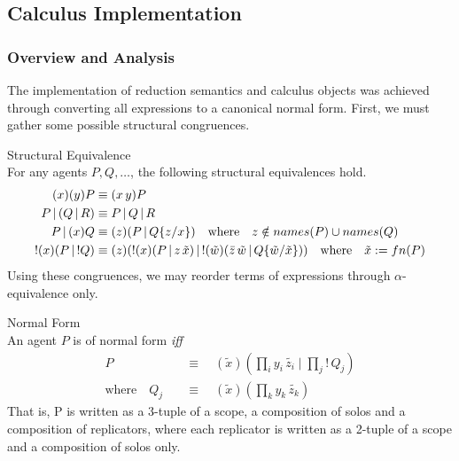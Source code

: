 \subsection{Calculus Implementation}\label{ssec:calculus-implementation}
    
    \subsubsection{Overview and Analysis}\label{sssec:calculus-analysis}
        The implementation of reduction semantics and calculus objects was achieved through converting all expressions to a canonical normal form.
        First, we must gather some possible structural congruences.

        \begin{lemma}{Structural Equivalence\\}
            For any agents $P, Q, \ldots$, the following structural equivalences hold.
            \begin{align*}
                (x)(y) P                & \equiv (x \, y) P \\
                P \, | \, (Q \, | \, R) & \equiv P \, | \, Q \, | \, R \\
                P \, | \, (x) Q         & \equiv (z)(P \, | \, Q\{z / x\}) \quad \text{where} \quad z \notin names(P) \cup names(Q) \\
                !(x)(P \, | \, !Q)      & \equiv (z)(!(x)(P \, | \, z \, \tilde{x}) \, | \, !(\tilde{w})(\bar{z} \, \tilde{w} \, | \, Q\{\tilde{w}/\tilde{x}\})) \quad \text{where} \quad \tilde{x} := fn(P)
            \end{align*}
            Using these congruences, we may reorder terms of expressions through $\alpha$-equivalence only.
        \end{lemma}

        \begin{definition}{Normal Form\\}
            An agent $P$ is of normal form \textit{iff}
            \begin{align*}
                                    P \quad &\equiv \quad (\tilde{x})(\prod_{i}{y_i \, \tilde{z_i}} \; | \; \prod_{j}{! \, Q_j}) \\
                \text{where} \quad Q_j \quad &\equiv \quad (\tilde{x})(\prod_{k}{y_k \, \tilde{z_k}})
            \end{align*}
            That is, P is written as a 3-tuple of a scope, a composition of solos and a composition of replicators, where each replicator is written as a 2-tuple of a scope and a composition of solos only.
        \end{definition}

